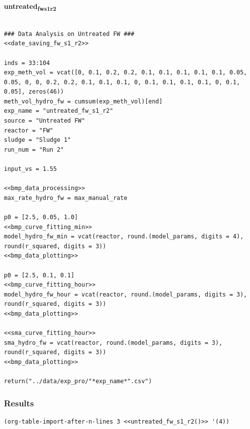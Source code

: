 \documentclass[11pt]{article}
\begin{document}
\textbf{untreated\textsubscript{fw}\textsubscript{s1}\textsubscript{r2}}
\begin{verbatim}

### Data Analysis on Untreated FW ###
<<date_saving_fw_s1_r2>>

inds = 33:104
exp_meth_vol = vcat([0, 0.1, 0.2, 0.2, 0.1, 0.1, 0.1, 0.1, 0.1, 0.05, 0.05, 0, 0, 0.2, 0.2, 0.1, 0.1, 0.1, 0, 0.1, 0.1, 0.1, 0.1, 0, 0.1, 0.05], zeros(46))
meth_vol_hydro_fw = cumsum(exp_meth_vol)[end]
exp_name = "untreated_fw_s1_r2"
source = "Untreated FW"
reactor = "FW"
sludge = "Sludge 1"
run_num = "Run 2"

input_vs = 1.55

<<bmp_data_processing>>
max_rate_hydro_fw = max_manual_rate

p0 = [2.5, 0.05, 1.0]
<<bmp_curve_fitting_min>>
model_hydro_fw_min = vcat(reactor, round.(model_params, digits = 4), round(r_squared, digits = 3))
<<bmp_data_plotting>>

p0 = [2.5, 0.1, 0.1]
<<bmp_curve_fitting_hour>>
model_hydro_fw_hour = vcat(reactor, round.(model_params, digits = 3), round(r_squared, digits = 3))
<<bmp_data_plotting>>

<<sma_curve_fitting_hour>>
sma_hydro_fw = vcat(reactor, round.(model_params, digits = 3), round(r_squared, digits = 3))
<<bmp_data_plotting>>

return("../data/exp_pro/"*exp_name*".csv")

\end{verbatim}

\subsubsection{Results}
\label{sec:org5042f9a}

\begin{verbatim}
(org-table-import-after-n-lines 3 <<untreated_fw_s1_r2()>> '(4))
\end{verbatim}
\end{document}
